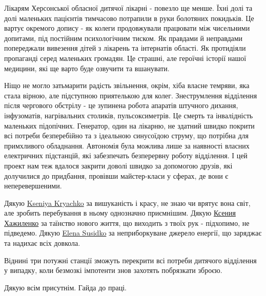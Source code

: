 Лікарям Херсонської обласної дитячої лікарні - повезло ще менше. Їхні долі та
долі маленьких пацієнтів тимчасово потрапили в руки болотяних покидьків. Це
вартує окремого допису - як колеги продовжували працювати між чисельними
допитами, під постійним психологічним тиском. Як правдами й неправдами
попереджали вивезення дітей з лікарень та інтернатів області. Як протидіяли
пропаганді серед маленьких громадян. Це страшні, але героїчні історії нашої
медицини, які ще варто буде озвучити та вшанувати. 

Ніщо не могло затьмарити радість звільнення, окрім, хіба власне темряви, яка
стала вірною, але підступною приятелькою для колег. Знеструмлення відділення
після чергового обстрілу - це зупинена робота апаратів штучного дихання,
інфузоматів, нагрівальних столиків, пульсоксиметрів. Це смерть та інвалідність
маленьких підопічних. Генератор, один на лікарню, не здатний швидко покрити всі
потреби безперебійно та з ідеальною синусоїдою струму, що потрібна для
примхливого обладнання. Автономія була можлива лише за наявності власних
електричних підстанцій, які забезпечать безперервну роботу відділення. І цей
проект нам теж вдалося закрити доволі швидко за допомогою друзів, які
долучилися до придбання, провівши майстер-класи у сферах, де вони є
неперевершеними. 

Дякую \href{https://www.facebook.com/kseniya.kryachko}{Kseniya Kryachko} за
вишуканість і красу, не знаю чи врятує вона світ, але зробить перебування в
ньому однозначно приємнішим. Дякую
\href{https://www.facebook.com/profile.php?id=100006566076129}{Ксения
Хажиленко} за таїнство нового життя, що виходить з твоїх рук - підхопимо, не
підведемо. Дякую \href{https://www.facebook.com/elena.susidko.5}{Elena Susidko}
за неприборкуване джерело енергії, що заряджає та надихає всіх довкола. 

Віднині три потужні станції зможуть перекрити всі потреби дитячого відділення у
випадку, коли безмозкі імпотенти знов захотять побрязкати зброєю. 

Дякую всім присутнім. Гайда до праці.
